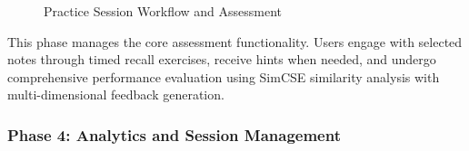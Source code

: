 \begin{figure}[H]
\caption{Practice Session Workflow and Assessment}
\label{fig:userflow-practice}
\end{figure}

This phase manages the core assessment functionality. Users engage with selected notes through timed recall exercises, receive hints when needed, and undergo comprehensive performance evaluation using SimCSE similarity analysis with multi-dimensional feedback generation.

\clearpage
\subsubsection{Phase 4: Analytics and Session Management}


